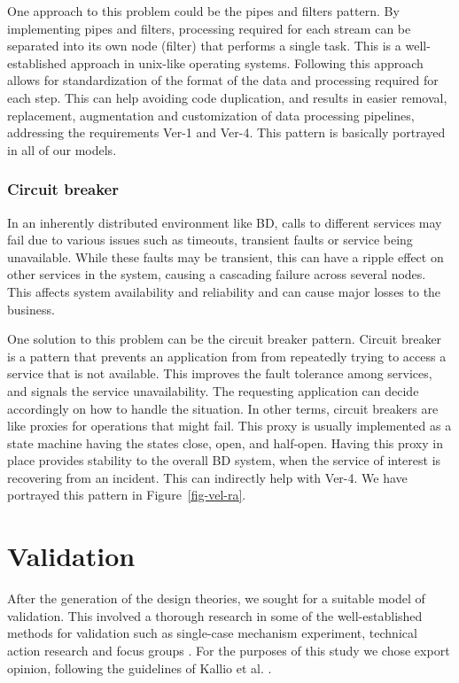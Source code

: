 \documentclass{bmcart}
\begin{document}
One approach to this problem could be the pipes and filters pattern. By implementing pipes and filters, processing required for each stream can be separated into its own node (filter) that performs a single task. This is a well-established approach in unix-like operating systems. Following this approach allows for standardization of the format of the data and processing required for each step. This can help avoiding code duplication, and results in easier removal, replacement, augmentation and customization of data processing pipelines, addressing the requirements Ver-1 and Ver-4. This pattern is basically portrayed in all of our models.

\subsubsection{Circuit breaker}
 
In an inherently distributed environment like BD, calls to different services may fail due to various issues such as timeouts, transient faults or service being unavailable. While these faults may be transient, this can have a ripple effect on other services in the system, causing a cascading failure across several nodes. This affects system availability and reliability and can cause major losses to the business. 

One solution to this problem can be the circuit breaker pattern. Circuit breaker is a pattern that prevents an application from from repeatedly trying to access a service that is not available. This improves the fault tolerance among services, and signals the service unavailability. The requesting application can decide accordingly on how to handle the situation. In other terms, circuit breakers are like proxies for operations that might fail. This proxy is usually implemented as a state machine having the states close, open, and half-open. Having this proxy in place provides stability to the overall BD system, when the service of interest is recovering from an incident. This can indirectly help with Ver-4. We have portrayed this pattern in Figure~\ref{fig-vel-ra}.



\section{Validation}

After the generation of the design theories, we sought for a suitable model of validation. This involved a thorough research in some of the well-established methods for validation such as single-case mechanism experiment, technical action research and focus groups \cite{wieringa2014design}. For the purposes of this study we chose export opinion, following the guidelines of Kallio et al. \cite{kallio2016systematic}. 
\end{document}
